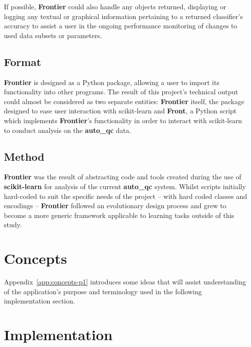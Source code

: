 If possible, \textbf{Frontier} could also handle any objects returned, displaying or
logging any textual or graphical information pertaining to a returned
classifier's accuracy to assist a user in the ongoing performance monitoring of
changes to used data subsets or parameters.


\subsection{Format}

\textbf{Frontier} is designed as a Python package, allowing a user to import its
functionality into other programs. The result of this project's technical
output could almost be considered as two separate entities: \textbf{Frontier} itself, the
package designed to ease user interaction with scikit-learn and \textbf{Front},
a Python script which implements \textbf{Frontier}'s functionality in order to interact
with scikit-learn to conduct analysis on the \textbf{auto\_qc} data.


\subsection{Method}
\label{sec:frontier-method}

\textbf{Frontier} was the result of abstracting code and tools created during
the use of \textbf{scikit-learn} for analysis of the current \textbf{auto\_qc}
system. Whilst scripts initially hard-coded to suit the specific needs of the
project -- with hard coded classes and encodings -- \textbf{Frontier} followed
an evolutionary design process and grew to become a more generic framework
applicable to learning tasks outside of this study.


\section{Concepts}

Appendix~\ref{app:concepts-p1} introduces some ideas that will assist
understanding of the application's purpose and terminology used in the following
implementation section.

\pagebreak
\section{Implementation}


